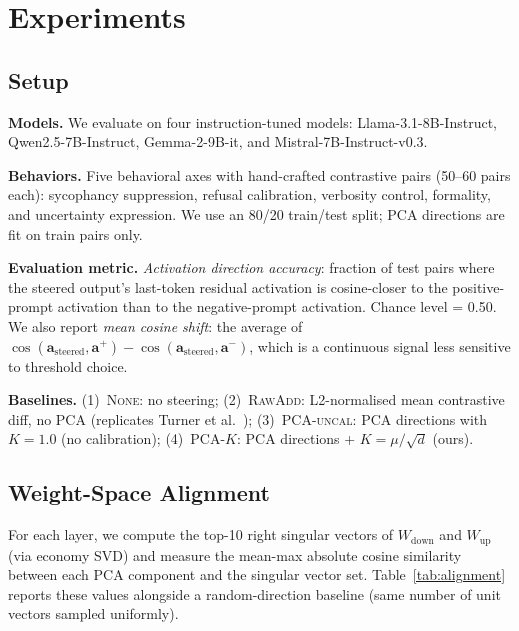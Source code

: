 \documentclass{article}
\begin{document}
\section{Experiments}
\label{sec:experiments}

\subsection{Setup}
\textbf{Models.}
We evaluate on four instruction-tuned models:
Llama-3.1-8B-Instruct, Qwen2.5-7B-Instruct, Gemma-2-9B-it, and Mistral-7B-Instruct-v0.3.

\textbf{Behaviors.}
Five behavioral axes with hand-crafted contrastive pairs (50--60 pairs each):
sycophancy suppression, refusal calibration, verbosity control, formality, and
uncertainty expression.
We use an 80/20 train/test split; PCA directions are fit on train pairs only.

\textbf{Evaluation metric.}
\emph{Activation direction accuracy}: fraction of test pairs where the steered
output's last-token residual activation is cosine-closer to the positive-prompt
activation than to the negative-prompt activation.
Chance level = 0.50.
We also report \emph{mean cosine shift}: the average of $\cos(\mathbf{a}_\text{steered}, \mathbf{a}^+) -
\cos(\mathbf{a}_\text{steered}, \mathbf{a}^-)$, which is a continuous signal less sensitive to threshold choice.

\textbf{Baselines.}
(1)~\textsc{None}: no steering;
(2)~\textsc{RawAdd}: L2-normalised mean contrastive diff, no PCA (replicates Turner et al.~\cite{turner2023activation});
(3)~\textsc{PCA-uncal}: PCA directions with $K=1.0$ (no calibration);
(4)~\textsc{PCA-$K$}: PCA directions + $K = \mu/\sqrt{d}$ (ours).

\subsection{Weight-Space Alignment}
\label{sec:exp_weight}

For each layer, we compute the top-10 right singular vectors of $W_\mathrm{down}$ and
$W_\mathrm{up}$ (via economy SVD) and measure the mean-max absolute cosine similarity
between each PCA component and the singular vector set.
Table~\ref{tab:alignment} reports these values alongside a random-direction baseline
(same number of unit vectors sampled uniformly).
\end{document}
